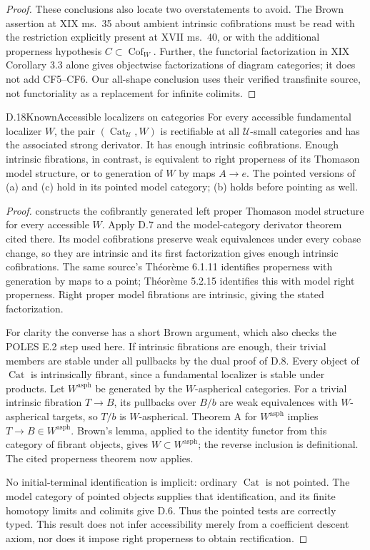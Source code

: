 \begin{proof}
These conclusions also locate two overstatements to avoid. The
Brown assertion at XIX ms.~35 about ambient intrinsic cofibrations
must be read with the restriction explicitly present at XVII
ms.~40, or with the additional properness hypothesis
$C\subset\operatorname{Cof}_W$. Further, the functorial
factorization in XIX Corollary 3.3 alone gives objectwise
factorizations of diagram categories; it does not add CF5--CF6.
Our all-shape conclusion uses their verified transfinite source,
not functoriality as a replacement for infinite colimits.
\end{proof}

\begin{result}{D.18}{Known}{Accessible localizers on categories}
For every accessible fundamental localizer $W$, the pair
$(\operatorname{Cat}_{\mathcal U},W)$ is rectifiable at all
$\mathcal U$-small categories and has the associated strong
derivator. It has enough intrinsic cofibrations. Enough intrinsic
fibrations, in contrast, is equivalent to right properness of its
Thomason model structure, or to generation of $W$ by maps $A\to e$.
The pointed versions of (a) and (c) hold in its pointed model
category; (b) holds before pointing as well.
\end{result}
\begin{proof}
\citet[Th\'eor\`eme 5.2.15]{DCisinski2006} constructs the
cofibrantly generated left proper Thomason model structure for
every accessible $W$. Apply D.7 and the model-category derivator
theorem cited there. Its model cofibrations preserve weak
equivalences under every cobase change, so they are intrinsic and
its first factorization gives enough intrinsic cofibrations.
The same source's Th\'eor\`eme 6.1.11 identifies properness with
generation by maps to a point; Th\'eor\`eme 5.2.15 identifies this
with model right properness. Right proper model fibrations are
intrinsic, giving the stated factorization.

For clarity the converse has a short Brown argument, which also
checks the POLES E.2 step used here. If intrinsic fibrations are
enough, their trivial members are stable under all pullbacks by
the dual proof of D.8. Every object of $\operatorname{Cat}$ is
intrinsically fibrant, since a fundamental localizer is stable
under products. Let $W^{\mathrm{asph}}$ be generated by the
$W$-aspherical categories. For a trivial intrinsic fibration
$T\to B$, its pullbacks over $B/b$ are weak equivalences with
$W$-aspherical targets, so $T/b$ is $W$-aspherical. Theorem A for
$W^{\mathrm{asph}}$ implies $T\to B\in W^{\mathrm{asph}}$.
Brown's lemma, applied to the identity functor from this category
of fibrant objects, gives $W\subset W^{\mathrm{asph}}$; the reverse
inclusion is definitional. The cited properness theorem now applies.

No initial-terminal identification is implicit: ordinary
$\operatorname{Cat}$ is not pointed. The model category of pointed
objects supplies that identification, and its finite homotopy
limits and colimits give D.6. Thus the pointed tests are correctly
typed. This result does not infer accessibility merely from a
coefficient descent axiom, nor does it impose right properness
to obtain rectification.
\end{proof}

